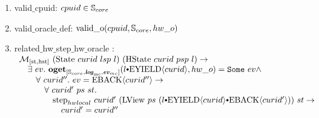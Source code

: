 \begin{figure}
\noindent{} 

\begin{enumerate}
\item valid$\_$cpuid: $cpuid \in {\mathbb{S}_{core}}$
\item valid$\_$oracle$\_$def: ${\mathrm{valid}\_\mathrm{o}}({cpuid}, {{\mathbb{S}_{core}}}, {hw\_o})$
\item related$\_$hw$\_$step$\_$hw$\_$oracle : \\
$
\begin{array}{l}
\matchstatehstate{(\mcstate{curid}{lsp}{l})}{(\hstate{curid}{psp}{l})} \rightarrow \\
\ \ \ \exists\ ev .\ \oget{\coreset}{\mclog}{\mcevent}{\listconsoppo{\yieldev{curid}}{l}}{hw\_o}{ev} \wedge \\
\ \ \ \ \ \ \forall \ curid'' . \ ev = \yieldbackev{curid''} \rightarrow\\
\ \ \ \ \ \ \ \ \  \forall \ curid' \ ps \ st . \\
\ \ \ \ \ \ \ \ \ \ \ \ \hardwarelocalstep{curid'}{(\localview{ps}{(\listconsoppo{\yieldbackev{curid'}}{\listconsoppo{\yieldev{curid}}{l}})})}{st} \rightarrow\\
\ \ \ \ \ \ \ \ \ \ \ \ \ \ \ curid' = curid'' \\
\end{array}
$
\end{enumerate}

\noindent{}


\end{figure}
